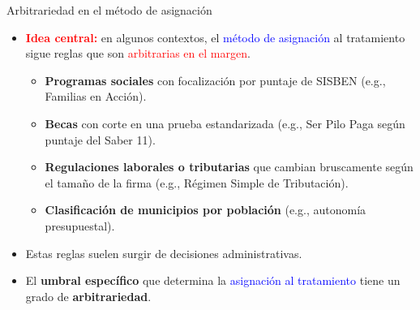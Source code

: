 \documentclass[10pt, xcolor=dvipsnames]{beamer}
\begin{document}
\begin{frame}{Arbitrariedad en el método de asignación}
\begin{itemize}
    \item \textcolor{red}{\textbf{Idea central:}} en algunos contextos, el \textcolor{blue}{método de asignación} al tratamiento sigue reglas que son \textcolor{red}{arbitrarias en el margen}. \smallspace
    \begin{itemize}
        \item \textbf{Programas sociales} con focalización por puntaje de SISBEN (e.g., Familias en Acción). %
        \item \textbf{Becas} con corte en una prueba estandarizada (e.g., Ser Pilo Paga según puntaje del Saber 11). %
        \item \textbf{Regulaciones laborales o tributarias} que cambian bruscamente según el tamaño de la firma (e.g., Régimen Simple de Tributación). %
        \item \textbf{Clasificación de municipios por población} (e.g., autonomía presupuestal). \smallspace 
    \end{itemize}
    \item Estas reglas suelen surgir de decisiones administrativas. %
    \item El \textbf{umbral específico} que determina la \textcolor{blue}{asignación al tratamiento} tiene un grado de \textbf{arbitrariedad}.
\end{itemize}
\end{frame}
\end{document}
